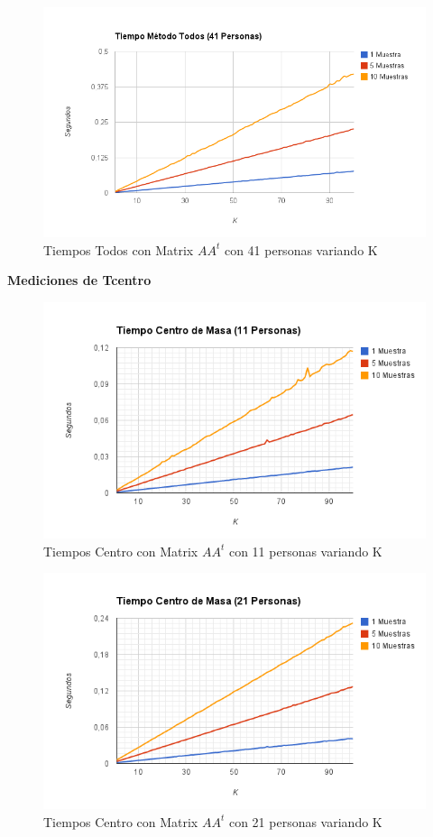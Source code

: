 \begin{figure}[H]
\includegraphics[width=1\textwidth]{img/imagef.png}
     \caption{Tiempos Todos con Matrix $AA^t$ con 41 personas variando K}
\end{figure}

\textbf{Mediciones de Tcentro }

\begin{figure}[H]
\includegraphics[width=1\textwidth]{img/imageg.png}
     \caption{Tiempos Centro con Matrix $AA^t$ con 11 personas variando K}
\end{figure}

\begin{figure}[H]
\includegraphics[width=1\textwidth]{img/imageh.png}
     \caption{Tiempos Centro con Matrix $AA^t$ con 21 personas variando K}
\end{figure}


